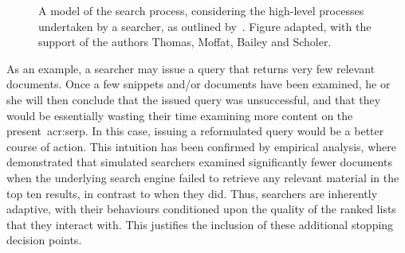 \begin{figure}[t!]
    \centering
    \caption[Model of the search process by~\cite{thomas2014modelling_behaviour}]{A model of the search process, considering the high-level processes undertaken by a searcher, as outlined by~\cite{thomas2014modelling_behaviour}. Figure adapted, with the support of the authors Thomas, Moffat, Bailey and Scholer.}
    \label{fig:thomas_model}
\end{figure}

As an example, a searcher may issue a query that returns very few relevant documents. Once a few snippets and/or documents have been examined, he or she will then conclude that the issued query was unsuccessful, and that they would be essentially wasting their time examining more content on the present~\gls{acr:serp}. In this case, issuing a reformulated query would be a better course of action. This intuition has been confirmed by empirical analysis, where~\cite{azzopardi2011economics} demonstrated that simulated searchers examined significantly fewer documents when the underlying search engine failed to retrieve any relevant material in the top ten results, in contrast to when they did. Thus, searchers are inherently adaptive, with their behaviours conditioned upon the quality of the ranked lists that they interact with. This justifies the inclusion of these additional stopping decision points.

